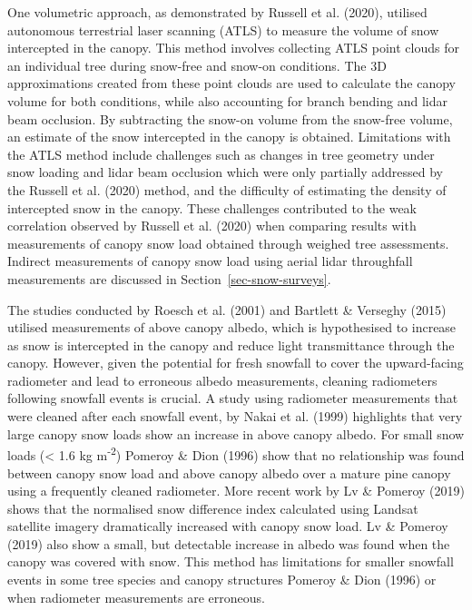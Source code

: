 \documentclass[
  letterpaper,
]{tex/uofsthesis-cs}
\begin{document}
One volumetric approach, as demonstrated by Russell et al. (2020),
utilised autonomous terrestrial laser scanning (ATLS) to measure the
volume of snow intercepted in the canopy. This method involves
collecting ATLS point clouds for an individual tree during snow-free and
snow-on conditions. The 3D approximations created from these point
clouds are used to calculate the canopy volume for both conditions,
while also accounting for branch bending and lidar beam occlusion. By
subtracting the snow-on volume from the snow-free volume, an estimate of
the snow intercepted in the canopy is obtained. Limitations with the
ATLS method include challenges such as changes in tree geometry under
snow loading and lidar beam occlusion which were only partially
addressed by the Russell et al. (2020) method, and the difficulty of
estimating the density of intercepted snow in the canopy. These
challenges contributed to the weak correlation observed by Russell et
al. (2020) when comparing results with measurements of canopy snow load
obtained through weighed tree assessments. Indirect measurements of
canopy snow load using aerial lidar throughfall measurements are
discussed in Section~\ref{sec-snow-surveys}.

The studies conducted by Roesch et al. (2001) and Bartlett \& Verseghy
(2015) utilised measurements of above canopy albedo, which is
hypothesised to increase as snow is intercepted in the canopy and reduce
light transmittance through the canopy. However, given the potential for
fresh snowfall to cover the upward-facing radiometer and lead to
erroneous albedo measurements, cleaning radiometers following snowfall
events is crucial. A study using radiometer measurements that were
cleaned after each snowfall event, by Nakai et al. (1999) highlights
that very large canopy snow loads show an increase in above canopy
albedo. For small snow loads (\textless{} 1.6 kg m\textsuperscript{-2})
Pomeroy \& Dion (1996) show that no relationship was found between
canopy snow load and above canopy albedo over a mature pine canopy using
a frequently cleaned radiometer. More recent work by Lv \& Pomeroy
(2019) shows that the normalised snow difference index calculated using
Landsat satellite imagery dramatically increased with canopy snow load.
Lv \& Pomeroy (2019) also show a small, but detectable increase in
albedo was found when the canopy was covered with snow. This method has
limitations for smaller snowfall events in some tree species and canopy
structures Pomeroy \& Dion (1996) or when radiometer measurements are
erroneous.
\end{document}
